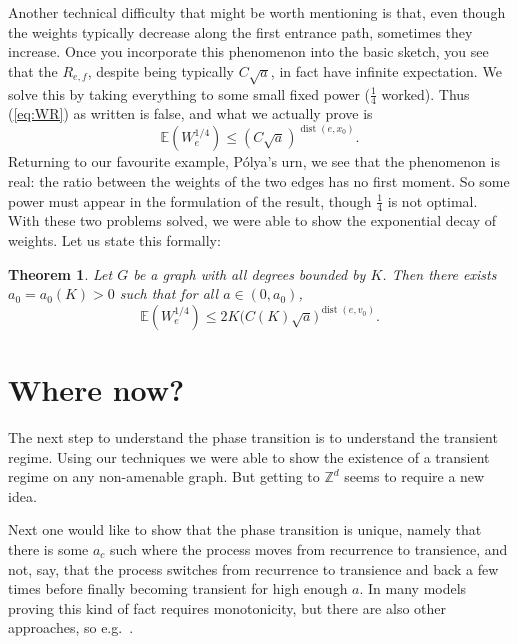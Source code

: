 \documentclass{emsprocart}
\theoremstyle{plain}
\newtheorem{thm}{Theorem}
\begin{document}
Another technical difficulty that might be worth mentioning is that,
even though the weights typically decrease along the first entrance
path, sometimes they increase. Once you incorporate this phenomenon
into the basic sketch, you see that the $R_{e,f}$, despite being
typically $C\sqrt{a}$, in fact have infinite expectation. We solve
this by taking everything to some small fixed power ($\frac{1}{4}$
worked). Thus (\ref{eq:WR}) as written is false, and what we actually
prove is 
\[
\mathbb{E}\left(W_{e}^{1/4}\right)\le(C\sqrt{a})^{\operatorname{dist}(e,x_{0})}.
\]
Returning to our favourite example, P\'olya's urn, we see that the
phenomenon is real: the ratio between the weights of the two edges
has no first moment. So some power must appear in the formulation
of the result, though $\frac{1}{4}$ is not optimal. With these two
problems solved, we were able to show the exponential decay of weights.
Let us state this formally:
\begin{thm}
Let $G$ be a graph with all degrees bounded by $K$. Then there exists
$a_{0}=a_{0}(K)>0$ such that for all $a\in(0,a_{0})$, 
\[
\mathbb{E}\left(W_{e}^{1/4}\right)\leq2K\Big(C(K)\sqrt{a}\Big)^{\operatorname{dist}(e,v_{0})}.
\]

\end{thm}

\section{Where now?}

The next step to understand the phase transition is to understand
the transient regime. Using our techniques we were able to show the
existence of a transient regime on any non-amenable graph. But getting
to $\mathbb{Z}^{d}$ seems to require a new idea. 

Next one would like to show that the phase transition is unique, namely
that there is some $a_{c}$ such where the process moves from recurrence
to transience, and not, say, that the process switches from recurrence
to transience and back a few times before finally becoming transient
for high enough $a$. In many models proving this kind of fact requires
monotonicity, but there are also other approaches, so e.g.\ \cite{H}.
\end{document}
